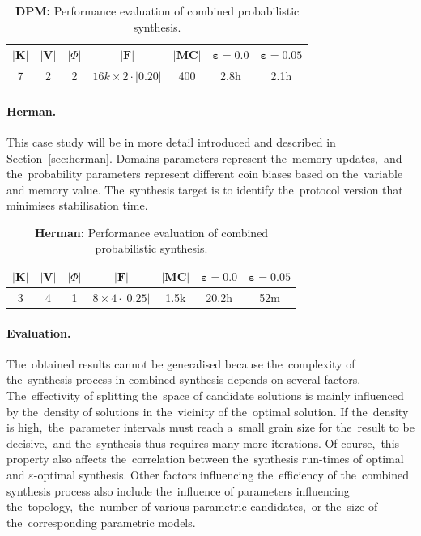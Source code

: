 \begin{table}[h!]
\centering
\begin{tabular}{|c|c|c|c|c|c|c|}
\hline
$\lvert \mathbf{K} \rvert$ & $\lvert \mathbf{V} \rvert$ & $\lvert \varPhi \rvert$ & $\lvert \mathcal{\mathbf{F}} \rvert$ & $\overline{\mathbf{\lvert MC \rvert}}$ & $\mathbf{\varepsilon = 0.0}$ & $\mathbf{\varepsilon = 0.05}$ \\ \hline
7 & 2 & 2 & $16k \times 2 \cdot \lvert 0.20 \rvert$ & 400 & 2.8h & 2.1h \\ \hline
\end{tabular}
\caption{\textbf{DPM:} Performance evaluation of combined probabilistic synthesis.}
\end{table}

\paragraph{Herman.}
This case study will be in more detail introduced and described in Section~\ref{sec:herman}.
Domains parameters represent the~memory updates,~and the~probability parameters represent different coin biases based on the~variable and memory value.
The~synthesis target is to identify the~protocol version that minimises stabilisation time.

\begin{table}[h!]
\centering
\begin{tabular}{|c|c|c|c|c|c|c|}
\hline
$\lvert \mathbf{K} \rvert$ & $\lvert \mathbf{V} \rvert$ & $\lvert \varPhi \rvert$ & $\lvert \mathcal{\mathbf{F}} \rvert$ & $\overline{\mathbf{\lvert MC \rvert}}$ & $\mathbf{\varepsilon = 0.0}$ & $\mathbf{\varepsilon = 0.05}$ \\ \hline
3 & 4 & 1 & $8 \times 4 \cdot \lvert 0.25 \rvert$ & 1.5k & 20.2h & 52m \\ \hline
\end{tabular}
\caption{\textbf{Herman:} Performance evaluation of combined probabilistic synthesis.}
\end{table}

\paragraph{Evaluation.}
The~obtained results cannot be generalised because the~complexity of the~synthesis process in combined synthesis depends on several factors. 
The~effectivity of splitting the~space of candidate solutions is mainly influenced by the~density of solutions in the~vicinity of the~optimal solution.
If the~density is high,~the~parameter intervals must reach a~small grain size for the~result to be decisive,~and the~synthesis thus requires many more iterations.
Of course,~this property also affects the~correlation between the~synthesis run-times of optimal and $\varepsilon$-optimal synthesis.
Other factors influencing the~efficiency of the~combined synthesis process also include the~influence of parameters influencing the~topology,~the~number of various parametric candidates,~or the~size of the~corresponding parametric models.


